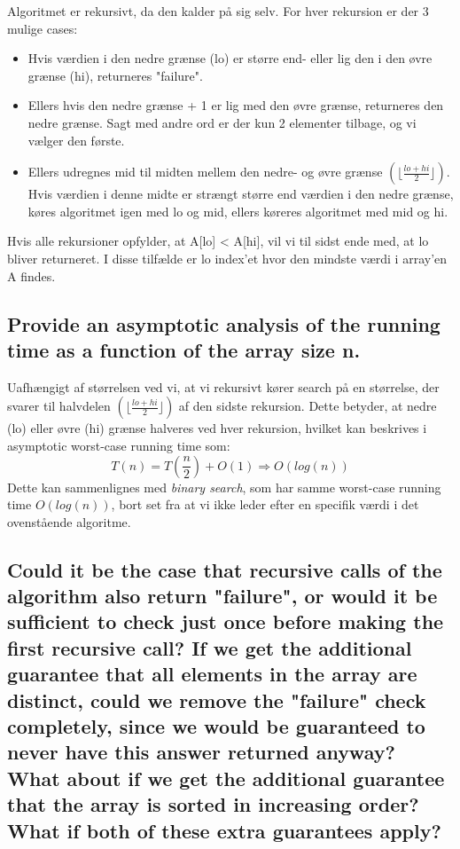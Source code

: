 \documentclass[a4paper,12pt]{article}
\begin{document}
Algoritmet er rekursivt, da den kalder på sig selv. For hver rekursion er der 3 mulige cases:
\begin{itemize}
    \item Hvis værdien i den nedre grænse (lo) er større end- eller lig den i den øvre grænse (hi), returneres "failure". 
    \item Ellers hvis den nedre grænse + 1 er lig med den øvre grænse, returneres den nedre grænse. Sagt med andre ord er der kun 2 elementer tilbage, og vi vælger den første.
    \item Ellers udregnes mid til midten mellem den nedre- og øvre grænse $(\lfloor\frac{lo + hi}{2}\rfloor)$. Hvis værdien i denne midte er strængt større end værdien i den nedre grænse, køres algoritmet igen med lo og mid, ellers køreres algoritmet med mid og hi.
\end{itemize}
Hvis alle rekursioner opfylder, at A[lo] < A[hi], vil vi til sidst ende med, at lo bliver returneret. I disse tilfælde er lo index'et hvor den mindste værdi i array'en A findes.
    
\subsection[]{Provide an asymptotic analysis of the running time as a function of the array size n.}

Uafhængigt af størrelsen ved vi, at vi rekursivt kører search på en størrelse, der svarer til halvdelen $(\lfloor\frac{lo + hi}{2}\rfloor)$ af den sidste rekursion. Dette betyder, at nedre (lo) eller øvre (hi) grænse halveres ved hver rekursion, hvilket kan beskrives i asymptotic worst-case running time som:
\[T(n)=T(\dfrac{n}{2})+O(1)\Rightarrow O(log(n))\]
Dette kan sammenlignes med \textit{binary search}, som har samme worst-case running time $O(log(n))$, bort set fra at vi ikke leder efter en specifik værdi i det ovenstående algoritme.

\subsection[]{Could it be the case that recursive calls of the algorithm also return "failure", or would it
be sufficient to check just once before making the first recursive call? If we get the additional
guarantee that all elements in the array are distinct, could we remove the "failure" check
completely, since we would be guaranteed to never have this answer returned anyway?
What about if we get the additional guarantee that the array is sorted in increasing order?
What if both of these extra guarantees apply?}
\end{document}
